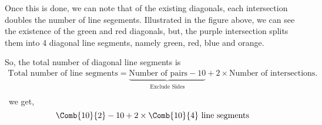 \begin{case_study}

    Once this is done, we can note that of the existing diagonals, each intersection doubles the number of line segements. Illustrated in the figure above, we can see the existence of the green and red diagonals, but, the purple intersection splits them into 4 diagonal line segments, namely green, red, blue and orange.

    \noindent So, the total number of diagonal line segments is
    \begin{align*}
        \text{Total number of line segments} =
        \underbrace{\text{Number of pairs}- 10}_{\substack{\text{Exclude Sides}}} + 2 \times \text{Number of intersections}. \\
    \end{align*}
    \therefore\ we get,
    \begin{equation*}
        \Comb{10}{2} - 10 + 2 \times \Comb{10}{4} \text{ line segments}
    \end{equation*}

\end{case_study}
